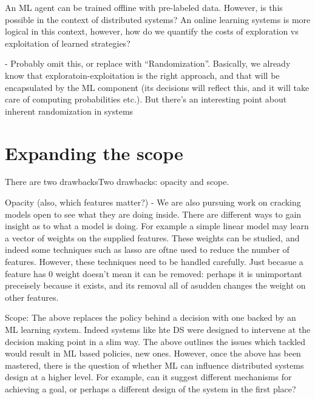 \documentclass[a4paper,twocolumn]{article}
\newcommand{\ignore}[1]{}
\begin{document}
An ML agent can be trained offline with pre-labeled data. However, is this
possible in the context of distributed systems? An online learning systems is
more logical in this context, however, how do we quantify the costs of
exploration vs exploitation of learned strategies?

- Probably omit this, or replace with ``Randomization''. Basically, we already know
that exploratoin-exploitation is the right approach, and that will be encapsulated
by the ML component (its decisions will reflect this, and it will take care of
computing probabilities etc.). But there's an interesting point about inherent randomization
in systems

\section{Expanding the scope}

There are two drawbacksTwo drawbacks: opacity and scope.

Opacity (also, which features matter?)
- We are also pursuing work on cracking models open to see what they are doing inside.
There are different ways to gain insight as to what a model is doing. For example a simple
linear model may learn a vector of weights on the supplied features. These weights can be
studied, and indeed some techniques such as lasso are oftne used to reduce the number of features. However, these
techniques need to be handled carefully. Just becasue a feature has 0 weight doesn't mean it
can be removed: perhaps it is unimportant preceisely because it exists, and its removal all of
asudden changes the weight on other features.


\ignore{
contextual multi-armed bandits. idea is to provide a context, get an action,
and only observe reward for that action. This matches the dist systems world well. It will generate new
policies using ML that we could not come up with by just thinking, and may not
even be able to describe. We argue in favor of opacity and rely instead on the guarantees
provided by the ML optimization.
}


Scope:
The above replaces the policy behind a decision with one backed by an ML learning system.
Indeed systems like hte DS were designed to intervene at the decision making point in a
slim way. The above outlines the issues which tackled would result in ML based policies,
new ones. However, once the above has been mastered, there is the question of whether ML
can influence distributed systems design at a higher level. For example, can it suggest
different mechanisms for achieving a goal, or perhaps a different design of the system in the first place?
\end{document}
